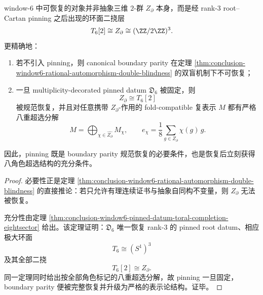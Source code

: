 \begin{corollary}\label{cor:conclusion-window6-pinning-necessary-sufficient-for-boundary-recovery}
window-\(6\) 中可恢复的对象并非抽象三维 \(2\)-群 \(Z_{\partial}\) 本身，而是经 rank-\(3\) root--Cartan pinning 之后出现的环面二挠层
\[
T_6[2]\cong Z_{\partial}\cong (\ZZ/2\ZZ)^3.
\]
更精确地：
\begin{enumerate}
  \item 若不引入 pinning，则 canonical boundary parity 在定理 \ref{thm:conclusion-window6-rational-automorphism-double-blindness} 的双盲机制下不可恢复；
  \item 一旦 multiplicity-decorated pinned datum \(\mathfrak D_6\) 被固定，则
  \[
  Z_{\partial}\cong T_6[2]
  \]
  被规范恢复，并且对任意携带 \(Z_{\partial}\)-作用的 fold-compatible 复表示 \(M\) 都有严格八重超选分解
  \[
  M=\bigoplus_{\chi\in \widehat{Z_{\partial}}}M_{\chi},
  \qquad
  e_{\chi}=\frac18\sum_{g\in Z_{\partial}}\chi(g)\,g.
  \]
\end{enumerate}
因此，pinning 既是 boundary parity 规范恢复的必要条件，也是恢复后立刻获得八角色超选结构的充分条件。
\end{corollary}
\begin{proof}
必要性正是定理 \ref{thm:conclusion-window6-rational-automorphism-double-blindness} 的直接推论：若只允许有理连续证书与抽象自同构不变量，则 \(Z_{\partial}\) 无法被恢复。

充分性由定理 \ref{thm:conclusion-window6-pinned-datum-toral-completion-eightsector} 给出。该定理证明：\(\mathfrak D_6\) 唯一恢复 rank-\(3\) 的 pinned root datum、相应极大环面
\[
T_6\cong (S^1)^3
\]
及其全部二挠
\[
T_6[2]\cong Z_{\partial}.
\]
同一定理同时给出按全部角色标记的八重超选分解，故 pinning 一旦固定，boundary parity 便被完整恢复并升级为严格的表示论结构。证毕。
\end{proof}

